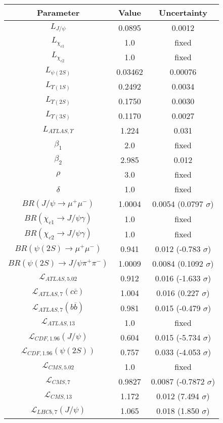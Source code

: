 \begin{table}[h!]
\centering
\begin{tabular}{c|c|c}
Parameter & Value & Uncertainty \\
\hline
$L_{J/\psi}$ & 0.0895 & 0.0012 \\
$L_{\chi_{c1}}$ & 1.0 & fixed \\
$L_{\chi_{c2}}$ & 1.0 & fixed \\
$L_{\psi(2S)}$ & 0.03462 & 0.00076 \\
$L_{\Upsilon(1S)}$ & 0.2492 & 0.0034 \\
$L_{\Upsilon(2S)}$ & 0.1750 & 0.0030 \\
$L_{\Upsilon(3S)}$ & 0.1170 & 0.0027 \\
$L_{ATLAS,\Upsilon}$ & 1.224 & 0.031 \\
$\beta_1$ & 2.0 & fixed \\
$\beta_2$ & 2.985 & 0.012 \\
$\rho$ & 3.0 & fixed \\
$\delta$ & 1.0 & fixed \\
$BR(J/\psi\rightarrow\mu^+\mu^-)$ & 1.0004 & 0.0054 (0.0797 $\sigma$) \\
$BR(\chi_{c1}\rightarrow J/\psi\gamma)$ & 1.0 & fixed \\
$BR(\chi_{c2}\rightarrow J/\psi\gamma)$ & 1.0 & fixed \\
$BR(\psi(2S)\rightarrow\mu^+\mu^-)$ & 0.941 & 0.012 (-0.783 $\sigma$) \\
$BR(\psi(2S)\rightarrow J/\psi\pi^+\pi^-)$ & 1.0009 & 0.0084 (0.1092 $\sigma$) \\
$\mathcal L_{ATLAS,5.02}$ & 0.912 & 0.016 (-1.633 $\sigma$) \\
$\mathcal L_{ATLAS,7}(c\overline c)$ & 1.004 & 0.016 (0.227 $\sigma$) \\
$\mathcal L_{ATLAS,7}(b\overline b)$ & 0.981 & 0.015 (-0.479 $\sigma$) \\
$\mathcal L_{ATLAS,13}$ & 1.0 & fixed \\
$\mathcal L_{CDF,1.96}(J/\psi)$ & 0.604 & 0.015 (-5.734 $\sigma$) \\
$\mathcal L_{CDF,1.96}(\psi(2S))$ & 0.757 & 0.033 (-4.053 $\sigma$) \\
$\mathcal L_{CMS,5.02}$ & 1.0 & fixed \\
$\mathcal L_{CMS,7}$ & 0.9827 & 0.0087 (-0.7872 $\sigma$) \\
$\mathcal L_{CMS,13}$ & 1.172 & 0.012 (7.494 $\sigma$) \\
$\mathcal L_{LHCb,7}(J/\psi)$ & 1.065 & 0.018 (1.850 $\sigma$) \\

\end{tabular}
\end{table}
